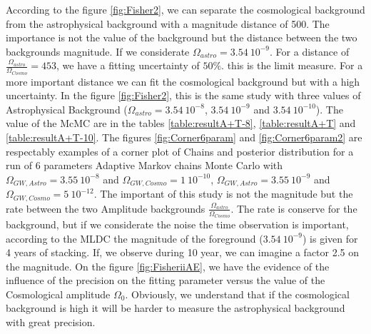 \documentclass[a4paper,12pt]{article}
\begin{document}
According to the figure \ref{fig:Fisher2}, we can separate the cosmological background from the astrophysical background with a magnitude distance of 500. The importance is not the value of the background but the distance between the two backgrounds magnitude. If we considerate $\Omega_{astro} = 3.54 \ 10^{-9}$. For a distance of $ \frac{\Omega_{astro}}{\Omega_{Cosmo}} = 453$, we have a fitting uncertainty of $50\%$. this is the limit measure. For a more important distance we can fit the cosmological background but with a high uncertainty. In the figure \ref{fig:Fisher2}, this is the same study with three values of Astrophysical Background ($\Omega_{astro} = 3.54 \ 10^{-8}$, $3.54 \ 10^{-9}$ and $3.54 \ 10^{-10}$). The value of the McMC are in the tables \ref{table:resultA+T-8}, \ref{table:resultA+T} and \ref{table:resultA+T-10}. The figures \ref{fig:Corner6param} and \ref{fig:Corner6param2} are respectably  examples of a corner plot of Chains and posterior distribution for a run of 6 parameters Adaptive Markov chains Monte Carlo with $\Omega_{GW,Astro} = 3.55 \ 10^{-8}$ and  $\Omega_{GW,Cosmo} = 1 \ 10^{-10}$, $\Omega_{GW,Astro} = 3.55 \ 10^{-9}$ and  $\Omega_{GW,Cosmo} = 5 \ 10^{-12}$.  The important of this study is not the magnitude but the rate between the two Amplitude backgrounds $\frac{\Omega_{astro}}{\Omega_{Cosmo}}$. The rate is conserve for the background, but if we considerate the noise the time observation is important, according to the MLDC \cite{LDCM} the magnitude of the foreground ($3.54 \ 10^{-9}$) is given for 4 years of stacking. If, we observe during 10 year, we can imagine a factor 2.5 on the magnitude. On the figure \ref{fig:FisheriiAE}, we have the evidence of the influence of the precision on the fitting parameter versus the value of the Cosmological amplitude $\Omega_0$. Obviously, we understand that if the cosmological background is high it will be harder to measure the astrophysical background with great precision.
\end{document}
